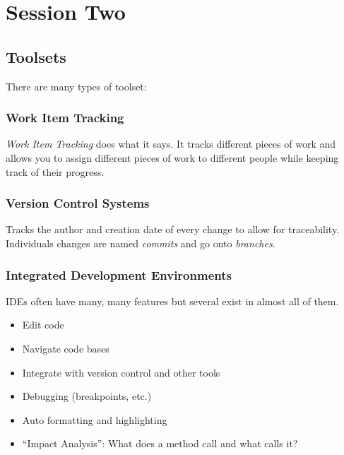 \section{Session Two}\label{sec:session_two}

\subsection{Toolsets}\label{sub:toolsets}

There are many types of toolset:

\subsubsection{Work Item Tracking}\label{ssub:work_item_tracking}

\emph{Work Item Tracking} does what it says.
It tracks different pieces of work and allows you to assign different pieces of work to different people while keeping track of their progress.

\subsubsection{Version Control Systems}\label{ssub:version_control_systems}

Tracks the author and creation date of every change to allow for traceability.
Individuals changes are named \emph{commits} and go onto \emph{branches}.

\subsubsection{Integrated Development Environments}\label{ssub:integrated_development_environments}

IDEs often have many, many features but several exist in almost all of them.

\begin{itemize}
    \item Edit code
    \item Navigate code bases
    \item Integrate with version control and other tools
    \item Debugging (breakpoints, etc.)
    \item Auto formatting and highlighting
    \item ``Impact Analysis'': What does a method call and what calls it?
\end{itemize}

